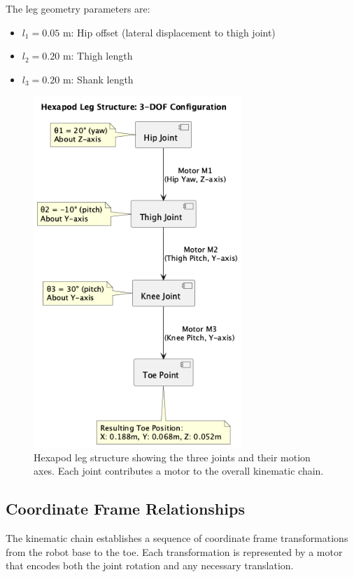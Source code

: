 \documentclass[11pt]{article}
\begin{document}
The leg geometry parameters are:
\begin{itemize}
    \item $l_1 = 0.05$ m: Hip offset (lateral displacement to thigh joint)
    \item $l_2 = 0.20$ m: Thigh length
    \item $l_3 = 0.20$ m: Shank length  
\end{itemize}

\begin{figure}[H]
    \centering
    \includegraphics[width=0.7\textwidth]{illustrations/hexapod_leg_structure.png}
    \caption{Hexapod leg structure showing the three joints and their motion axes. Each joint contributes a motor to the overall kinematic chain.}
    \label{fig:leg_structure}
\end{figure}

\subsection{Coordinate Frame Relationships}

The kinematic chain establishes a sequence of coordinate frame transformations from the robot base to the toe. Each transformation is represented by a motor that encodes both the joint rotation and any necessary translation.
\end{document}
